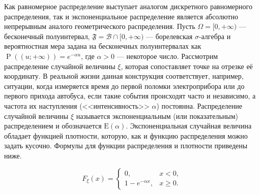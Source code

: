 \documentclass[12pt]{article}
\numberwithin{theorem}{section}
\theoremstyle{definition}
\newcommand{\defin}[2]{\hypertarget{#2}{{\color{red} #1}}}
\newcommand{\calB}{\mathcal{B}}
\newcommand{\prob}{\operatorname{P}}
\newcommand{\events}{\mathfrak{F}}
\begin{document}
	Как равномерное распределение выступает аналогом дискретного равномерного распределения,
	так и экспоненциальное распределение является абсолютно непрерывным аналого геометрического распределения.
	Пусть $ \Omega = [0,+\infty) $ --- бесконечный полуинтервал, $ \events = \calB \cap [0,+\infty) $ 
	--- борелевская $ \sigma $-алгебра
	и вероятностная мера задана на бесконечных полуинтервалах как $ \prob((u; +\infty)) = e^{-\alpha u} $,
	где $ \alpha > 0 $ --- некоторое число.
	Рассмотрим распределение случайной величины $ \xi $, которая сопоставляет точке на отрезке её координату.
	В реальной жизни данная конструкция соответствует, например, ситуации, когда измеряется время до первой поломки
	электроприбора или до первого прихода автобуса, 
	если такие события происходят часто и независимо, а частота их наступления (<<интенсивность>> $ \alpha $) постоянна.
	Распределение случайной величины $ \xi $ называется 
	\defin{экспоненциальным (или показательным) распределением}{exponential-distribution}
	и обозначается $ \mathrm{E}(\alpha) $.
	Экспоненциальная случайная величина обладает функцией плотности,
	которую, как и функцию распределения можно задать кусочно.
	Формулы для функции распределения и плотности приведены ниже. 
	\begin{center}
		\begin{minipage}{0.45\textwidth}
			\[
			F_\xi(x) =
			\begin{cases}
				0, & x < 0, \\
				1 - e^{-\alpha x}, & x \geqslant 0.
			\end{cases}
			\]
		\end{minipage}
		\begin{minipage}{0.5\textwidth}
		\end{minipage}
	\end{center}
	
\end{document}
